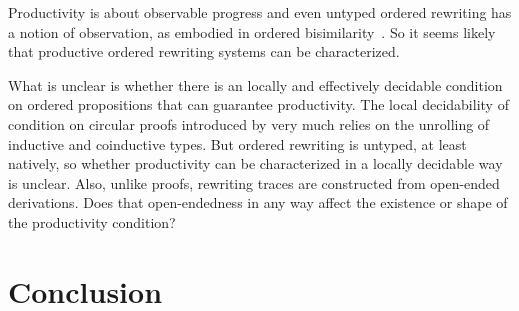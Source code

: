 Productivity is about observable progress and even untyped ordered rewriting has a notion of observation, as embodied in ordered bisimilarity~.
So it seems likely that productive ordered rewriting systems can be characterized.

What is unclear is whether there is an locally and effectively decidable condition on ordered propositions that can guarantee productivity.
The local decidability of condition on circular proofs introduced by \citeauthor{Derakhshan+Pfenning:??}
very much relies on the unrolling of inductive and coinductive types.
But ordered rewriting is untyped, at least natively, so whether productivity can be characterized in a locally decidable way is unclear.
Also, unlike proofs, rewriting traces are constructed from open-ended derivations.
Does that open-endedness in any way affect the existence or shape of the productivity condition?

\section{Conclusion}


